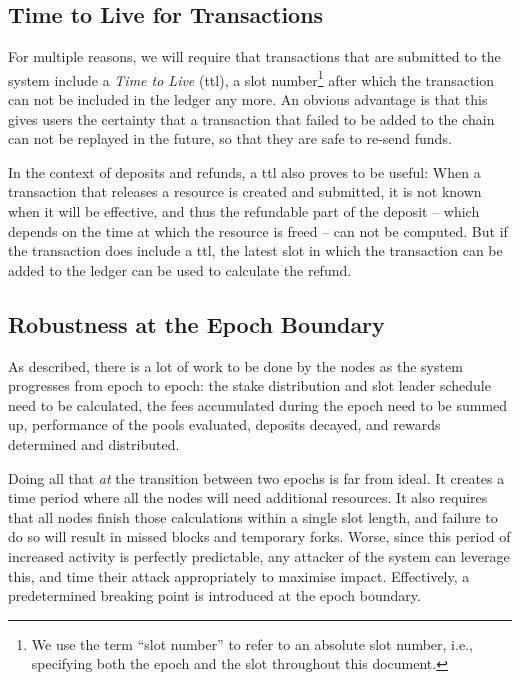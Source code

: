 \documentclass[11pt,a4paper,dvipsnames,twosided]{article}
\begin{document}
\subsection{Time to Live for Transactions}
\label{time-to-live-for-transactions}

For multiple reasons, we will require that transactions that are submitted to
the system include a \emph{Time to Live} (ttl), a slot number\footnote{We use
  the term ``slot number'' to refer to an absolute slot number, i.e., specifying
  both the epoch and the slot throughout this document.} after which the
transaction can not be included in the ledger any more. An obvious advantage is
that this gives users the certainty that a transaction that failed to be added
to the chain can not be replayed in the future, so that they are safe to re-send
funds.

In the context of deposits and refunds, a ttl also proves to be useful: When a
transaction that releases a resource is created and submitted, it is not known
when it will be effective, and thus the refundable part of the deposit -- which
depends on the time at which the resource is freed -- can not be computed. But
if the transaction does include a ttl, the latest slot in which the transaction
can be added to the ledger can be used to calculate the refund.

\subsection{Robustness at the Epoch Boundary}
\label{robustness-at-the-epoch-boundary}

As described, there is a lot of work to be done by the nodes as the system
progresses from epoch to epoch: the stake distribution and slot leader schedule
need to be calculated, the fees accumulated during the epoch need to be
summed up, performance of the pools evaluated, deposits decayed, and
rewards determined and distributed.

Doing all that \emph{at} the transition between two epochs is far from ideal. It
creates a time period where all the nodes will need additional resources. It
also requires that all nodes finish those calculations within a single slot
length, and failure to do so will result in missed blocks and temporary forks.
Worse, since this period of increased activity is perfectly predictable, any
attacker of the system can leverage this, and time their attack appropriately to
maximise impact. Effectively, a predetermined breaking point is introduced at
the epoch boundary.
\end{document}
